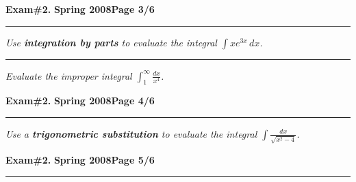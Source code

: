 \documentclass[12pt]{article}
\begin{document}
\hfill{\large\bf Exam\#2.}\hfill{\large\bf
  Spring 2008}\hfill{\large\bf Page 3/6}\hrule

\bigskip
{\problem[10 pts] \em Use \textbf{integration by parts} to evaluate the integral $\displaystyle{\int xe^{3x}\, dx}$.}
\vspace{6cm}
\begin{flushright}
\end{flushright}
\hrule
{\problem[10 pts] \em Evaluate the improper integral $\displaystyle{\int_1^\infty \frac{dx}{x^4}}$.}
\vspace{10cm}
\begin{flushright}
\end{flushright}
\newpage

\hfill{\large\bf Exam\#2.}\hfill{\large\bf
  Spring 2008}\hfill{\large\bf Page 4/6}\hrule

\bigskip
{\problem[10 pts] \em Use a \textbf{trigonometric substitution} to evaluate the integral $\displaystyle{\int \frac{dx}{\sqrt{x^2-4}}}$.}
\vspace{18cm}
\begin{flushright}
\end{flushright}
\newpage

\hfill{\large\bf Exam\#2.}\hfill{\large\bf
  Spring 2008}\hfill{\large\bf Page 5/6}\hrule
\end{document}

